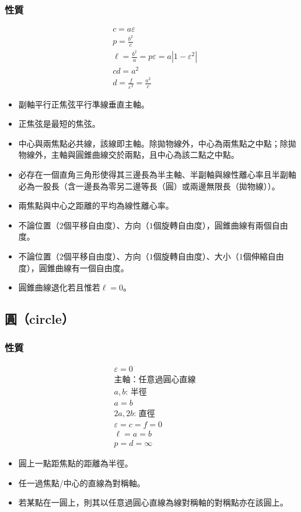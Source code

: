 \documentclass[a4paper,12pt]{article}
\begin{document}
\subsubsection{性質}
\[\begin{aligned}
&c=a\varepsilon\\
&p=\frac{b^2}{c}\\
&\ell=\frac{b^2}{a}=p\varepsilon=a|1-\varepsilon^2|\\
&cd=a^2\\
&d=\frac{f}{\varepsilon^2}=\frac{a^2}{c}
\end{aligned}\]
\begin{itemize}
\item 副軸平行正焦弦平行準線垂直主軸。
\item 正焦弦是最短的焦弦。
\item 中心與兩焦點必共線，該線即主軸。除拋物線外，中心為兩焦點之中點；除拋物線外，主軸與圓錐曲線交於兩點，且中心為該二點之中點。
\item 必存在一個直角三角形使得其三邊長為半主軸、半副軸與線性離心率且半副軸必為一股長（含一邊長為零另二邊等長（圓）或兩邊無限長（拋物線））。
\item 兩焦點與中心之距離的平均為線性離心率。
\item 不論位置（$2$個平移自由度）、方向（$1$個旋轉自由度），圓錐曲線有兩個自由度。
\item 不論位置（$2$個平移自由度）、方向（$1$個旋轉自由度）、大小（$1$個伸縮自由度），圓錐曲線有一個自由度。
\item 圓錐曲線退化若且惟若$\ell=0$。
\end{itemize}
\subsection{圓（circle）}
\subsubsection{性質}
\[\begin{aligned}
&\varepsilon=0\\
&\text{主軸：任意過圓心直線}\\
&a,b:\,\text{半徑}\\
&a=b\\
&2a,2b:\,\text{直徑}\\
&\varepsilon=c=f=0\\
&\ell=a=b\\
&p=d=\infty
\end{aligned}\]
\begin{itemize}
\item 圓上一點距焦點的距離為半徑。
\item 任一過焦點/中心的直線為對稱軸。
\item 若某點在一圓上，則其以任意過圓心直線為線對稱軸的對稱點亦在該圓上。
\end{itemize}
\end{document}
